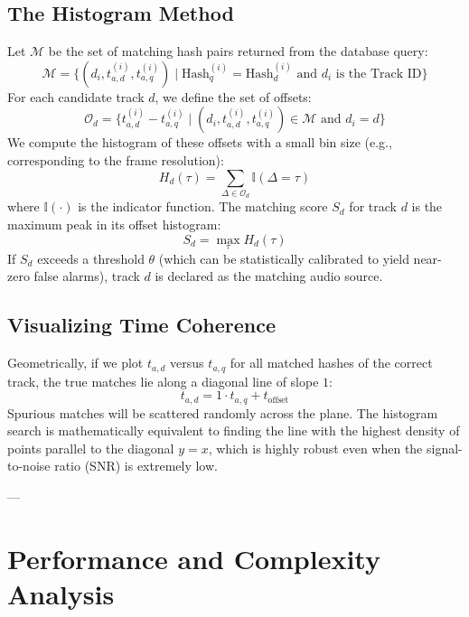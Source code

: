 \documentclass[11pt,journal,onecolumn]{IEEEtran}
\begin{document}
\subsection{The Histogram Method}
Let $\mathcal{M}$ be the set of matching hash pairs returned from the database query:
\begin{equation}
\mathcal{M} = \Big\{ (d_i, t_{a, d}^{(i)}, t_{a, q}^{(i)}) \mid \text{Hash}_q^{(i)} = \text{Hash}_d^{(i)} \text{ and } d_i \text{ is the Track ID} \Big\}
\end{equation}
For each candidate track $d$, we define the set of offsets:
\begin{equation}
\mathcal{O}_d = \Big\{ t_{a, d}^{(i)} - t_{a, q}^{(i)} \mid (d_i, t_{a, d}^{(i)}, t_{a, q}^{(i)}) \in \mathcal{M} \text{ and } d_i = d \Big\}
\end{equation}
We compute the histogram of these offsets with a small bin size (e.g., corresponding to the frame resolution):
\begin{equation}
H_d(\tau) = \sum_{\Delta \in \mathcal{O}_d} \mathbb{I}(\Delta = \tau)
\end{equation}
where $\mathbb{I}(\cdot)$ is the indicator function. The matching score $S_d$ for track $d$ is the maximum peak in its offset histogram:
\begin{equation}
S_d = \max_{\tau} H_d(\tau)
\end{equation}
If $S_d$ exceeds a threshold $\theta$ (which can be statistically calibrated to yield near-zero false alarms), track $d$ is declared as the matching audio source.

\subsection{Visualizing Time Coherence}
Geometrically, if we plot $t_{a, d}$ versus $t_{a, q}$ for all matched hashes of the correct track, the true matches lie along a diagonal line of slope $1$:
\begin{equation}
t_{a, d} = 1 \cdot t_{a, q} + t_{\text{offset}}
\end{equation}
Spurious matches will be scattered randomly across the plane. The histogram search is mathematically equivalent to finding the line with the highest density of points parallel to the diagonal $y=x$, which is highly robust even when the signal-to-noise ratio (SNR) is extremely low.

---

\section{Performance and Complexity Analysis}
\end{document}
